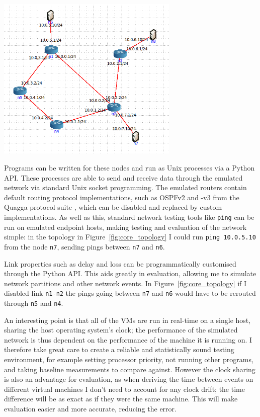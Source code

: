 \documentclass[withindex,glossary,openany]{cam-thesis}
\begin{document}
\begin{center}
\begin{minipage}{0.9\textwidth} \centering
	\includegraphics[width=0.65\textwidth]{core_topology}
	\label{fig:core_topology}
\end{minipage}
\end{center}

Programs can be written for these nodes and run as Unix processes via a Python API. These processes are able to send and receive data through the emulated network via standard Unix socket programming. The emulated routers contain default routing protocol implementations, such as OSPFv2 and -v3 from the Quagga protocol suite \cite{QUAGGA}, which can be disabled and replaced by custom implementations. As well as this, standard network testing tools like \texttt{ping} can be run on emulated endpoint hosts, making testing and evaluation of the network simple: in the topology in Figure~\ref{fig:core_topology} I could run \texttt{ping 10.0.5.10} from the node \texttt{n7}, sending pings between \texttt{n7} and \texttt{n6}.

Link properties such as delay and loss can be programmatically customised through the Python API. This aids greatly in evaluation, allowing me to simulate network partitions and other network events. In Figure~\ref{fig:core_topology} if I disabled link \texttt{n1-n2} the pings going between \texttt{n7} and \texttt{n6} would have to be rerouted through \texttt{n5} and \texttt{n4}.

An interesting point is that all of the VMs are run in real-time on a single host, sharing the host operating system's clock; the performance of the simulated network is thus dependent on the performance of the machine it is running on. I therefore take great care to create a reliable and statistically sound testing environment, for example setting processor priority, not running other programs, and taking baseline measurements to compare against. However the clock sharing is also an advantage for evaluation, as when deriving the time between events on different virtual machines I don't need to account for any clock drift; the time difference will be as exact as if they were the same machine. This will make evaluation easier and more accurate, reducing the error.
\end{document}
